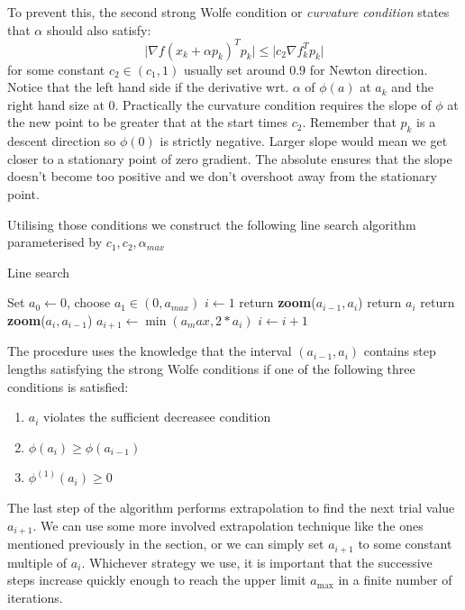 \documentclass[11pt]{report}
\begin{document}
    To prevent this, the second strong Wolfe condition or \textit{curvature condition} states that $\alpha$ should also satisfy:
    \begin{equation}
        \lvert \nabla f(x_k + \alpha p_k )^T p_k \rvert \leq \lvert c_2 \nabla f_k^T p_k \rvert
    \end{equation}
    for some constant $c_2 \in (c_1, 1)$ usually set around $0.9$ for Newton direction.
    Notice that the left hand side if the derivative wrt. $\alpha$ of $\phi(a)$ at $a_k$ and the right hand size at $0$.
    Practically the curvature condition requires the slope of $\phi$ at the new point to be greater that at the start times $c_2$.
    Remember that $p_k$ is a descent direction so $\phi(0)$ is strictly negative.
    Larger slope would mean we get closer to a stationary point of zero gradient.
    The absolute ensures that the slope doesn't become too positive and we don't overshoot away from the stationary point.

    Utilising those conditions we construct the following line search algorithm parameterised by $c_1, c_2, \alpha_{max}$

    \begin{algorithm}
        \caption{Line search}
        \label{alg:linesearh}
        \begin{algorithmic}
            \State Set $a_0 \gets 0$, choose $a_1 \in (0, a_{max})$
            \State $i \gets 1$
            \Repeat
                    \State return \textbf{zoom}($a_{i-1}, a_i$)
                \EndIf
                    \State return $a_i$
                \EndIf
                    \State return \textbf{zoom}($a_i, a_{i-1}$)
                \EndIf
                \State $a_{i+1} \gets \min({a_max, 2*a_i})$
                \State $i \gets i+1$
            \Until
        \end{algorithmic}
    \end{algorithm}

    The procedure uses the knowledge that the interval $(a_{i-1} , a_{i})$ contains step lengths satisfying the strong Wolfe
    conditions if one of the following three conditions is satisfied:
    \begin{enumerate}
        \item $a_i$ violates the sufficient decreasee condition
        \item $\phi(a_i) \geq \phi(a_{i-1}) $
        \item $\phi^{(1)}(a_i) \geq 0$
    \end{enumerate}
    The last step of the algorithm performs extrapolation to find the next trial value $a_{i+1}$.
    We can use some more involved extrapolation technique like the ones mentioned previously in the section, or
    we can simply set $a_{i+1}$ to some constant multiple of $a_i$.
    Whichever strategy we use, it is
    important that the successive steps increase quickly enough to reach the upper limit $a_{\max}$ in
    a finite number of iterations.
\end{document}
